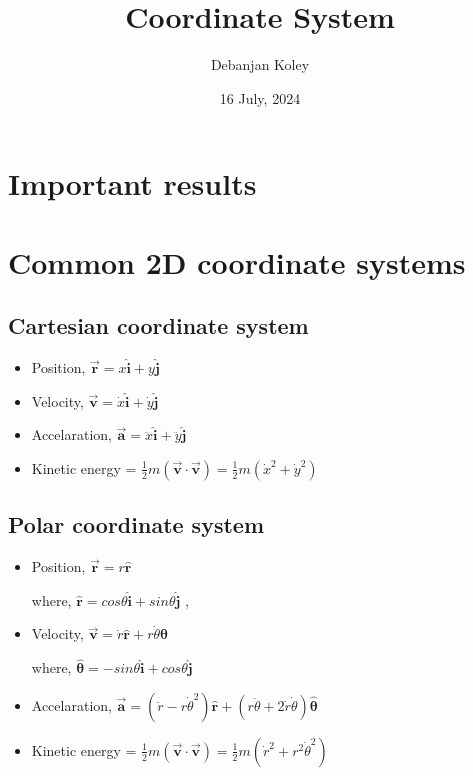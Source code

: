\documentclass{article}
\title{Coordinate System}
\author{Debanjan Koley}
\date{16 July, 2024}
\newcommand{\uvec}[1]{\bm{\hat{#1}}}
\begin{document}
\maketitle
\section*{Important results}
\section{Common 2D coordinate systems}

\subsection{Cartesian coordinate system}
\begin{itemize}
    \item Position, $\bm{\vec{r}} = x\uvec{i} + y\uvec{j}$
    \item Velocity, $\bm{\vec{v}} = \dot{x}\uvec{i} + \dot{y}\uvec{j}$
    \item Accelaration, $\bm{\vec{a}} = \ddot{x}\uvec{i} + \ddot{y}\uvec{j}$
    \item Kinetic energy = $\frac{1}{2}m(\bm{\vec{v}\cdot\vec{v}}) = \frac{1}{2}m(\dot{x}^2 + \dot{y}^2)$
\end{itemize}

\subsection{Polar coordinate system}
\begin{itemize}
    \item Position, $\bm{\vec{r}} = r\uvec{r}$
    
    where, $\uvec{r} = cos\theta\uvec{i} + sin\theta\uvec{j}$ ,
    \item Velocity, $\bm{\vec{v}} = \dot{r}\uvec{r} + r\dot{\theta}\uvec{\theta}$
    
    where, $\uvec{\theta} = -sin\theta\uvec{i} + cos\theta\uvec{j}$
    \item Accelaration, $\bm{\vec{a}} = (\ddot{r} - r\dot{\theta}^2)\uvec{r} + (r\ddot{\theta} + 2\dot{r}\dot{\theta})\uvec{\theta}$
    \item Kinetic energy = $\frac{1}{2}m(\bm{\vec{v}\cdot\vec{v}}) = \frac{1}{2}m(\dot{r}^2 + r^2\dot{\theta}^2)$
\end{itemize}
\end{document}

